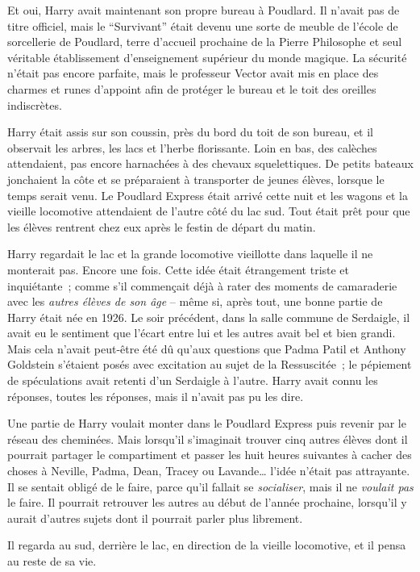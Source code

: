 Et oui, Harry avait maintenant son propre bureau à Poudlard. Il n'avait pas de titre officiel, mais le “Survivant” était devenu une sorte de meuble de l'école de sorcellerie de Poudlard, terre d'accueil prochaine de la Pierre Philosophe et seul véritable établissement d'enseignement supérieur du monde magique. La sécurité n'était pas encore parfaite, mais le professeur Vector avait mis en place des charmes et runes d'appoint afin de protéger le bureau et le toit des oreilles indiscrètes.

Harry était assis sur son coussin, près du bord du toit de son bureau, et il observait les arbres, les lacs et l'herbe florissante. Loin en bas, des calèches attendaient, pas encore harnachées à des chevaux squelettiques. De petits bateaux jonchaient la côte et se préparaient à transporter de jeunes élèves, lorsque le temps serait venu. Le Poudlard Express était arrivé cette nuit et les wagons et la vieille locomotive attendaient de l'autre côté du lac sud. Tout était prêt pour que les élèves rentrent chez eux après le festin de départ du matin.

Harry regardait le lac et la grande locomotive vieillotte dans laquelle il ne monterait pas. Encore une fois. Cette idée était étrangement triste et inquiétante~; comme s'il commençait déjà à rater des moments de camaraderie avec les \emph{autres élèves de son âge} -- même si, après tout, une bonne partie de Harry était née en 1926. Le soir précédent, dans la salle commune de Serdaigle, il avait eu le sentiment que l'écart entre lui et les autres avait bel et bien grandi. Mais cela n'avait peut-être été dû qu'aux questions que Padma Patil et Anthony Goldstein s'étaient posés avec excitation au sujet de la Ressuscitée~; le pépiement de spéculations avait retenti d'un Serdaigle à l'autre. Harry avait connu les réponses, toutes les réponses, mais il n'avait pas pu les dire.

Une partie de Harry voulait monter dans le Poudlard Express puis revenir par le réseau des cheminées. Mais lorsqu'il s'imaginait trouver cinq autres élèves dont il pourrait partager le compartiment et passer les huit heures suivantes à cacher des choses à Neville, Padma, Dean, Tracey ou Lavande… l'idée n'était pas attrayante. Il se sentait obligé de le faire, parce qu'il fallait se \emph{socialiser}, mais il ne \emph{voulait pas} le faire. Il pourrait retrouver les autres au début de l'année prochaine, lorsqu'il y aurait d'autres sujets dont il pourrait parler plus librement.

Il regarda au sud, derrière le lac, en direction de la vieille locomotive, et il pensa au reste de sa vie.

